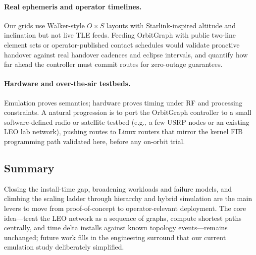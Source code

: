 \paragraph{Real ephemeris and operator timelines.}
Our grids use Walker-style $O{\times}S$ layouts with Starlink-inspired altitude
and inclination but not live TLE feeds.
Feeding OrbitGraph with public two-line element sets or operator-published
contact schedules would validate proactive handover against real handover
cadences and eclipse intervals, and quantify how far ahead the controller must
commit routes for zero-outage guarantees.

\paragraph{Hardware and over-the-air testbeds.}
Emulation proves semantics; hardware proves timing under RF and processing
constraints.
A natural progression is to port the OrbitGraph controller to a small
software-defined radio or satellite testbed (e.g., a few USRP nodes or an
existing LEO lab network), pushing routes to Linux routers that mirror the
kernel FIB programming path validated here, before any on-orbit trial.

\subsection{Summary}

Closing the install-time gap, broadening workloads and failure models, and
climbing the scaling ladder through hierarchy and hybrid simulation are the
main levers to move from proof-of-concept to operator-relevant deployment.
The core idea---treat the LEO network as a sequence of graphs, compute
shortest paths centrally, and time delta installs against known topology
events---remains unchanged; future work fills in the engineering surround
that our current emulation study deliberately simplified.
